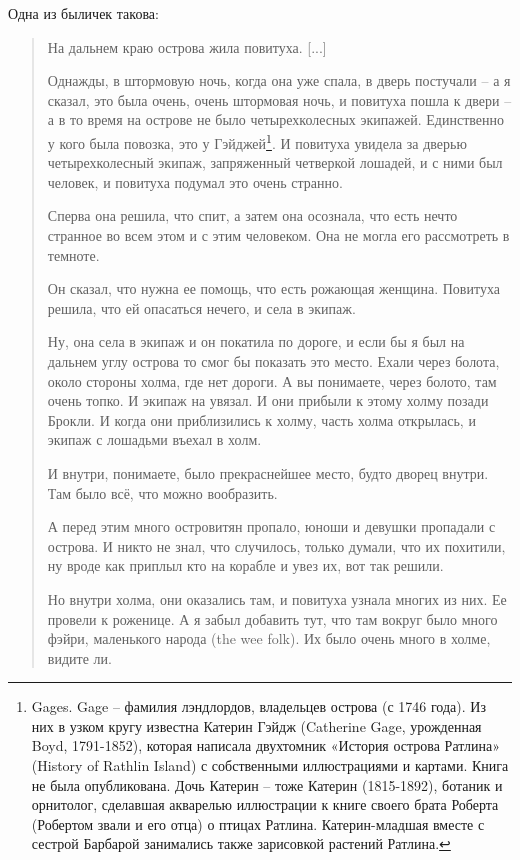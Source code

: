 Одна из быличек такова:

\begin{quotation}
На дальнем краю острова жила повитуха. [...]

Однажды, в штормовую ночь, когда она уже спала, в дверь постучали – а я сказал, это была очень, очень штормовая ночь, и повитуха пошла к двери – а в то время на острове не было четырехколесных экипажей. Единственно у кого была повозка, это у Гэйджей\footnote{Gages. Gage – фамилия лэндлордов, владельцев острова (с 1746 года). Из них в узком кругу известна Катерин Гэйдж (Catherine Gage, урожденная Boyd, 1791-1852), которая написала двухтомник «История острова Ратлина» (History of Rathlin Island) с собственными иллюстрациями и картами. Книга не была опубликована. Дочь Катерин – тоже Катерин (1815-1892), ботаник и орнитолог, сделавшая акварелью иллюстрации к книге своего брата Роберта (Робертом звали и его отца) о птицах Ратлина. Катерин-младшая вместе с сестрой Барбарой занимались также зарисовкой растений Ратлина.}. И повитуха увидела за дверью четырехколесный экипаж, запряженный четверкой лошадей, и с ними был человек, и повитуха подумал это очень странно.

Сперва она решила, что спит, а затем она осознала, что есть нечто странное во всем этом и с этим человеком. Она не могла его рассмотреть в темноте.

Он сказал, что нужна ее помощь, что есть рожающая женщина. Повитуха решила, что ей опасаться нечего, и села в экипаж.

Ну, она села в экипаж и он покатила по дороге, и если бы я был на дальнем углу острова то смог бы показать это место. Ехали через болота, около стороны холма, где нет дороги. А вы понимаете, через болото, там очень топко. И экипаж на увязал. И они прибыли к этому холму позади Брокли. И когда они приблизились к холму, часть холма открылась, и экипаж с лошадьми въехал в холм.

И внутри, понимаете, было прекраснейшее место, будто дворец внутри. Там было всё, что можно вообразить.

А перед этим много островитян пропало, юноши и девушки пропадали с острова. И никто не знал, что случилось, только думали, что их похитили, ну вроде как приплыл кто на корабле и увез их, вот так решили.

Но внутри холма, они оказались там, и повитуха узнала многих из них. Ее провели к роженице. А я забыл добавить тут, что там вокруг было много фэйри, маленького народа (the wee folk). Их было очень много в холме, видите ли.


\end{quotation}
